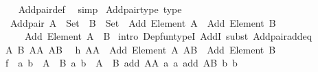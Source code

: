 \begin{isabellebody}
%
\isadelimproof
\ \ %
\endisadelimproof
%
\isatagproof
{}\isamarkupfalse%
\ Add{\isacharunderscore}{\kern0pt}pair{\isacharunderscore}{\kern0pt}def\ \isamarkupfalse%
\ simp%
\endisatagproof
{\isafoldproof}%
%
\isadelimproof
\isanewline
%
\endisadelimproof
\isanewline
\isanewline
{}\isamarkupfalse%
\ Add{\isacharunderscore}{\kern0pt}pair{\isacharunderscore}{\kern0pt}type\ {\isacharbrackleft}{\kern0pt}type{\isacharbrackright}{\kern0pt}{\isacharcolon}{\kern0pt}\isanewline
\ \ {\isachardoublequoteopen}Add{\isacharunderscore}{\kern0pt}pair{\isacharcolon}{\kern0pt}\ {\isacharparenleft}{\kern0pt}A\ {\isacharcolon}{\kern0pt}\ Set{\isacharparenright}{\kern0pt}\ {\isasymRightarrow}\ {\isacharparenleft}{\kern0pt}B\ {\isacharcolon}{\kern0pt}\ Set{\isacharparenright}{\kern0pt}\ {\isasymRightarrow}\ Add\ {\isacharparenleft}{\kern0pt}Element\ A{\isacharparenright}{\kern0pt}\ {\isasymRightarrow}\ Add\ {\isacharparenleft}{\kern0pt}Element\ B{\isacharparenright}{\kern0pt}\isanewline
\ \ \ \ {\isasymRightarrow}\ Add\ {\isacharparenleft}{\kern0pt}Element\ {\isacharparenleft}{\kern0pt}A\ {\isasymtimes}\ B{\isacharparenright}{\kern0pt}{\isacharparenright}{\kern0pt}{\isachardoublequoteclose}\isanewline
%
\isadelimproof
%
\endisadelimproof
%
\isatagproof
{}\isamarkupfalse%
\ {\isacharparenleft}{\kern0pt}intro\ Dep{\isacharunderscore}{\kern0pt}fun{\isacharunderscore}{\kern0pt}typeI\ AddI{\isacharcomma}{\kern0pt}\ subst\ Add{\isacharunderscore}{\kern0pt}pair{\isacharunderscore}{\kern0pt}add{\isacharunderscore}{\kern0pt}eq{\isacharparenright}{\kern0pt}\isanewline
\ \ \isamarkupfalse%
\ A\ B\ AA\ AB\ \isamarkupfalse%
\ h{\isacharcolon}{\kern0pt}\ {\isachardoublequoteopen}AA\ {\isacharcolon}{\kern0pt}\ Add\ {\isacharparenleft}{\kern0pt}Element\ A{\isacharparenright}{\kern0pt}{\isachardoublequoteclose}\ {\isachardoublequoteopen}AB\ {\isacharcolon}{\kern0pt}\ Add\ {\isacharparenleft}{\kern0pt}Element\ B{\isacharparenright}{\kern0pt}{\isachardoublequoteclose}\isanewline
\ \ \isamarkupfalse%
\ {\isacharquery}{\kern0pt}f\ {\isacharequal}{\kern0pt}\ {\isachardoublequoteopen}{\isasymlambda}{\isasymlangle}a{}{\isacharcomma}{\kern0pt}\ b{}{\isasymrangle}\ {\isasymin}\ A\ {\isasymtimes}\ B{\isachardot}{\kern0pt}\ {\isasymlambda}{\isasymlangle}a{}{\isacharcomma}{\kern0pt}\ b{}{\isasymrangle}\ {\isasymin}\ A\ {\isasymtimes}\ B{\isachardot}{\kern0pt}\ {\isasymlangle}add\ AA\ a{}\ a{}{\isacharcomma}{\kern0pt}\ add\ AB\ b{}\ b{}{\isasymrangle}{\isachardoublequoteclose}\isanewline

\end{isabellebody}
